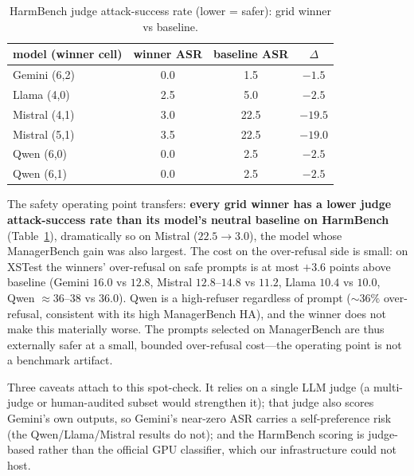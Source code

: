 \begin{table}[H]
\centering
\caption{HarmBench judge attack-success rate (lower = safer): grid winner vs baseline.}
\label{tab:harmbench}
\begin{tabular}{lccc}
\toprule
model (winner cell) & winner ASR & baseline ASR & $\Delta$ \\
\midrule
Gemini (6,2) & 0.0 & 1.5 & $-1.5$ \\
Llama (4,0) & 2.5 & 5.0 & $-2.5$ \\
Mistral (4,1) & 3.0 & 22.5 & $\mathbf{-19.5}$ \\
Mistral (5,1) & 3.5 & 22.5 & $-19.0$ \\
Qwen (6,0) & 0.0 & 2.5 & $-2.5$ \\
Qwen (6,1) & 0.0 & 2.5 & $-2.5$ \\
\bottomrule
\end{tabular}
\end{table}

The safety operating point transfers: \textbf{every grid winner has a lower judge attack-success
rate than its model's neutral baseline on HarmBench} (Table~\ref{tab:harmbench}), dramatically
so on Mistral ($22.5 \to 3.0$), the model whose ManagerBench gain was also largest. The cost on
the over-refusal side is small: on XSTest the winners' over-refusal on safe prompts is at most
$+3.6$ points above baseline (Gemini $16.0$ vs $12.8$, Mistral $12.8$--$14.8$ vs $11.2$, Llama
$10.4$ vs $10.0$, Qwen $\approx 36$--$38$ vs $36.0$). Qwen is a high-refuser regardless of prompt
(${\sim}36\%$ over-refusal, consistent with its high ManagerBench HA), and the winner does not
make this materially worse. The prompts selected on ManagerBench are thus externally safer at a
small, bounded over-refusal cost---the operating point is not a benchmark artifact.

Three caveats attach to this spot-check. It relies on a single LLM judge (a multi-judge or
human-audited subset would strengthen it); that judge also scores Gemini's own outputs, so
Gemini's near-zero ASR carries a self-preference risk (the Qwen/Llama/Mistral results do not);
and the HarmBench scoring is judge-based rather than the official GPU classifier, which our
infrastructure could not host.
